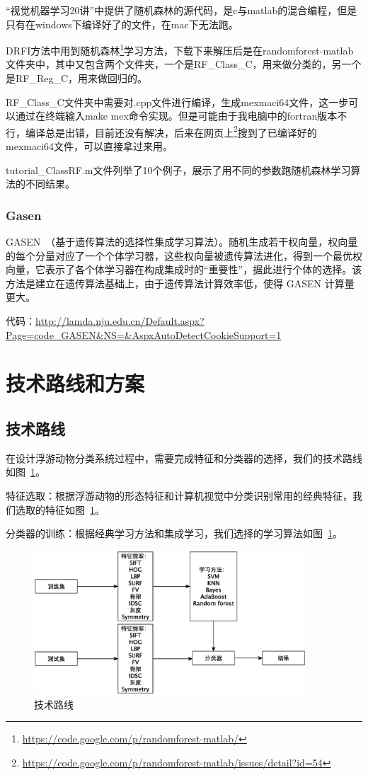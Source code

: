 \documentclass[12pt]{article}
\begin{document}
“视觉机器学习20讲”中提供了随机森林的源代码，是c与matlab的混合编程，但是只有在windows下编译好了的文件，在mac下无法跑。

DRFI方法中用到随机森林\footnote{\url{https://code.google.com/p/randomforest-matlab/}}学习方法，下载下来解压后是在randomforest-matlab文件夹中，其中又包含两个文件夹，一个是RF\_Class\_C，用来做分类的，另一个是RF\_Reg\_C，用来做回归的。

RF\_Class\_C文件夹中需要对.cpp文件进行编译，生成mexmaci64文件，这一步可以通过在终端输入make mex命令实现。但是可能由于我电脑中的fortran版本不行，编译总是出错，目前还没有解决，后来在网页上\footnote{\url{https://code.google.com/p/randomforest-matlab/issues/detail?id=54}}搜到了已编译好的mexmaci64文件，可以直接拿过来用。

tutorial\_ClassRF.m文件列举了10个例子，展示了用不同的参数跑随机森林学习算法的不同结果。

\subsubsection{Gasen}

GASEN~\cite{zhou2002ensembling}（基于遗传算法的选择性集成学习算法）。随机生成若干权向量，权向量的每个分量对应了一个个体学习器，这些权向量被遗传算法进化，得到一个最优权向量，它表示了各个体学习器在构成集成时的“重要性”，据此进行个体的选择。该方法是建立在遗传算法基础上，由于遗传算法计算效率低，使得 GASEN 计算量更大。

{\color{blue}代码}：\url{http://lamda.nju.edu.cn/Default.aspx?Page=code_GASEN&NS=&AspxAutoDetectCookieSupport=1}

\section{技术路线和方案}

\subsection{技术路线}

在设计浮游动物分类系统过程中，需要完成特征和分类器的选择，我们的技术路线如图~\ref{fig:TechnicalRoute}。

特征选取：根据浮游动物的形态特征和计算机视觉中分类识别常用的经典特征，我们选取的特征如图~\ref{fig:TechnicalRoute}。

分类器的训练：根据经典学习方法和集成学习，我们选择的学习算法如图~\ref{fig:TechnicalRoute}。

    \begin{figure}[!ht]
    \centering
    \includegraphics[width=4in]{TechnicalRoute}
    \caption{技术路线}
    \label{fig:TechnicalRoute}
    \end{figure}
    
\end{document}
